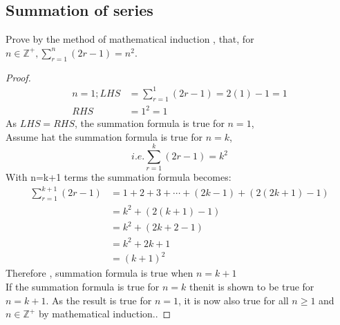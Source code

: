 \documentclass[a4paper]{article}
\begin{document}
\subsection{Summation of series}
\begin{eg}
	Prove by the method of mathematical induction , that, for $n\in\mathbb{Z}^+ , \sum_{r=1}^n(2r-1)=n^2$.
	\begin{proof}
		\begin{align*}
			n=1;LHS & =\sum_{r=1}^1(2r-1)=2(1)-1=1 \\
			RHS     & =1^2=1
		\end{align*}
		As $LHS=RHS$, the summation formula is true for $n=1$,\\

		Assume hat the summation formula is true for $n=k$,
		\begin{equation*}
			i.e. \sum_{r=1}^k(2r-1)=k^2
		\end{equation*}
		With n=k+1 terms the summation formula becomes:
		\begin{align*}
			\sum_{r=1}^{k+1}(2r-1) & =1+2+3+\cdots+(2k-1)+(2(2k+1)-1) \\
			                       & =k^2+(2(k+1)-1)                  \\
			                       & =k^2+(2k+2-1)                    \\
			                       & =k^2+2k+1                        \\
			                       & =(k+1)^2
		\end{align*}
		Therefore , summation formula is true when $n=k+1$\\
		If the summation formula is true for $n=k$ thenit is shown to be true for $n=k+1$. As the result is true for $n=1$, it is now also true for all $n\geq1$ and $n\in\mathbb{Z}^+$ by mathematical induction..
	\end{proof}
\end{eg}
\end{document}
